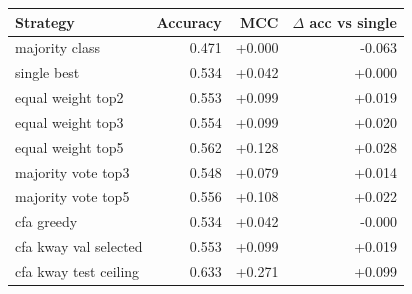 \begin{tabular}{lrrr}
\toprule
Strategy & Accuracy & MCC & $\Delta$ acc vs single \\
\midrule
majority class & 0.471 & +0.000 & -0.063 \\
single best & 0.534 & +0.042 & +0.000 \\
equal weight top2 & 0.553 & +0.099 & +0.019 \\
equal weight top3 & 0.554 & +0.099 & +0.020 \\
equal weight top5 & 0.562 & +0.128 & +0.028 \\
majority vote top3 & 0.548 & +0.079 & +0.014 \\
majority vote top5 & 0.556 & +0.108 & +0.022 \\
cfa greedy & 0.534 & +0.042 & -0.000 \\
cfa kway val selected & 0.553 & +0.099 & +0.019 \\
cfa kway test ceiling & 0.633 & +0.271 & +0.099 \\
\bottomrule
\end{tabular}